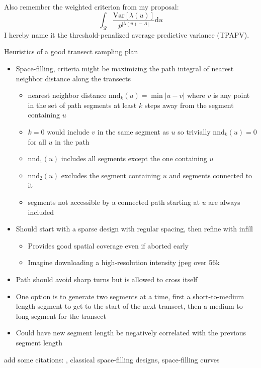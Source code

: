 \documentclass[review]{elsarticle}
\begin{document}
Also remember the weighted criterion from my proposal:
\begin{equation*}
\int_{\mathcal{R}} \frac{\mathrm{Var}\left[\lambda(u)\right]}
{p^{\left|\lambda(u)-A\right|}} \mathrm{d}u
\end{equation*}
I hereby name it the threshold-penalized average predictive variance (TPAPV).

Heuristics of a good transect sampling plan
\begin{itemize}
\item Space-filling, criteria might be maximizing the path integral of nearest
neighbor distance along the transects
\begin{itemize}
\item nearest neighbor distance \(\mathrm{nnd}_{k}(u) = \min|u - v|\) where
\(v\) is any point in the set of path segments at least \(k\) steps away from
the segment containing \(u\)
\item \(k = 0\) would include \(v\) in the same segment as \(u\) so trivially
\(\mathrm{nnd}_{k}(u) = 0\) for all \(u\) in the path
\item \(\mathrm{nnd}_{1}(u)\) includes all segments except the one containing \(u\)
\item \(\mathrm{nnd}_{2}(u)\) excludes the segment containing \(u\) and segments
connected to it
\item segments not accessible by a connected path starting at \(u\) are always
included
\end{itemize}
\item Should start with a sparse design with regular spacing, then refine with
infill
\begin{itemize}
\item Provides good spatial coverage even if aborted early
\item Imagine downloading a high-resolution intensity jpeg over 56k
\end{itemize}
\item Path should avoid sharp turns but is allowed to cross itself
\item One option is to generate two segments at a time, first a short-to-medium
length segment to get to the start of the next transect, then a  medium-to-long
segment for the transect
\item Could have new segment length be negatively correlated with the previous
segment length
\end{itemize}

add some citations: \citet{lark}, classical space-filling designs,
space-filling curves \cite{sagan}
\end{document}
